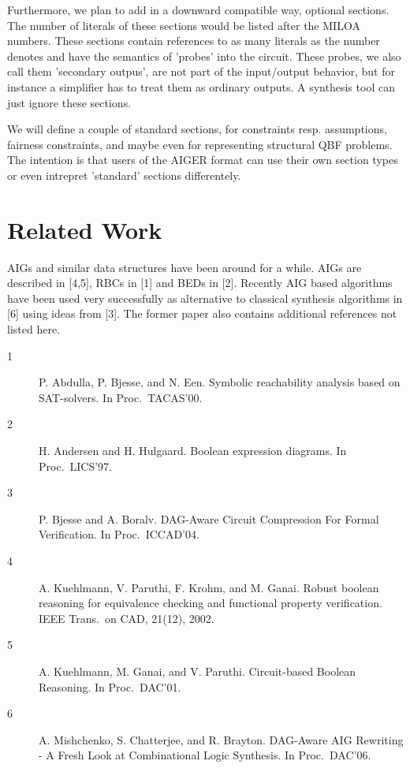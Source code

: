 \documentclass[10pt]{llncs}
\begin{document}
  Furthermore, we plan to add in a downward compatible way, optional
  sections.  The number of literals of these sections would be listed after
  the MILOA numbers.  These sections contain references to as many literals
  as the number denotes and have the semantics of 'probes' into the circuit.
  These probes, we also call them 'secondary outpus', are not part of the
  input/output behavior, but for instance a simplifier has to treat them as
  ordinary outputs.  A synthesis tool can just ignore these sections.
  
  We will define a couple of standard sections, for constraints resp.
  assumptions, fairness constraints, and maybe even for representing
  structural QBF problems.  The intention is that users of the AIGER format
  can use their own section types or even intrepret 'standard' sections
  differentely.
  
\section{Related Work}

  AIGs and similar data structures have been around for a while.  AIGs are
  described in [4,5], RBCs in [1] and BEDs in [2].  Recently AIG based
  algorithms have been used very successfully as alternative to classical
  synthesis algorithms in [6] using ideas from [3].  The former paper
  also contains additional references not listed here.

\begin{description}

\item[1] P. Abdulla, P. Bjesse, and N. Een.
  Symbolic reachability analysis based on SAT-solvers.
  In Proc.~TACAS'00.

\item[2] H. Andersen and H. Hulgaard. 
  Boolean expression diagrams.
  In Proc.~LICS'97.

\item[3] P. Bjesse and A. Boralv.
  DAG-Aware Circuit Compression For Formal Verification.
  In Proc.~ICCAD'04.

\item[4] A. Kuehlmann, V. Paruthi, F. Krohm, and M. Ganai.
  Robust boolean reasoning for equivalence checking and functional 
  property verification.
  IEEE Trans.~on CAD, 21(12), 2002. 

\item[5] A. Kuehlmann, M. Ganai, and V. Paruthi. 
  Circuit-based Boolean Reasoning. 
  In Proc.~DAC'01.

\item[6] A. Mishchenko, S. Chatterjee, and R. Brayton. 
  DAG-Aware AIG Rewriting - A Fresh Look at Combinational Logic Synthesis. 
  In Proc.~DAC'06. 

\end{description}
\end{document}
